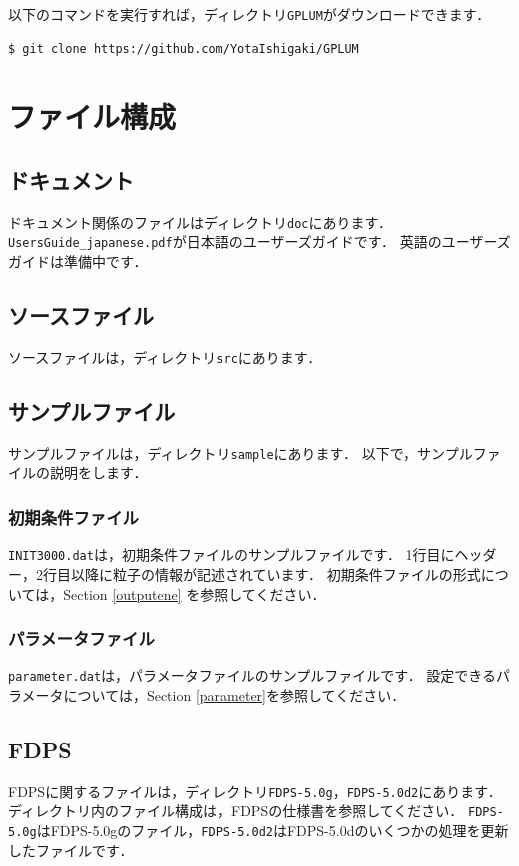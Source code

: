 \documentclass[12pt,a4paper,dvipdfmx]{jsarticle}
\newcommand{\ourcode}{GPLUM\xspace}
\begin{document}
以下のコマンドを実行すれば，ディレクトリ\texttt{\ourcode}がダウンロードできます．
\begin{verbatim}
$ git clone https://github.com/YotaIshigaki/GPLUM
\end{verbatim}

\section{ファイル構成}

\subsection{ドキュメント}
ドキュメント関係のファイルはディレクトリ\texttt{doc}にあります．
\texttt{UsersGuide\_japanese.pdf}が日本語のユーザーズガイドです．
英語のユーザーズガイドは準備中です．

\subsection{ソースファイル}
ソースファイルは，ディレクトリ\texttt{src}にあります．

\subsection{サンプルファイル}
サンプルファイルは，ディレクトリ\texttt{sample}にあります．
以下で，サンプルファイルの説明をします．
\subsubsection{初期条件ファイル}
\texttt{INIT3000.dat}は，初期条件ファイルのサンプルファイルです．
1行目にヘッダー，2行目以降に粒子の情報が記述されています．
初期条件ファイルの形式については，Section \ref{outputene} を参照してください．

\subsubsection{パラメータファイル}
\texttt{parameter.dat}は，パラメータファイルのサンプルファイルです．
設定できるパラメータについては，Section \ref{parameter}を参照してください．

\subsection{FDPS}
FDPSに関するファイルは，ディレクトリ\texttt{FDPS-5.0g}，\texttt{FDPS-5.0d2}にあります．
ディレクトリ内のファイル構成は，FDPSの仕様書を参照してください．
\texttt{FDPS-5.0g}はFDPS-5.0gのファイル，\texttt{FDPS-5.0d2}はFDPS-5.0dのいくつかの処理を更新したファイルです．
\end{document}
